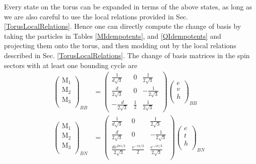 \documentclass[12pt,a4paper]{article}
\begin{document}
Every state on the torus can be expanded in terms of the above states, as long as we are also careful to use the local relations provided in Sec. \ref{TorusLocalRelations}.
Hence one can directly compute the change of basis by taking the particles in Tables \ref{MIdempotents},  and \ref{QIdempotents} and projecting them onto the torus, and then modding out by the local relations described in Sec. \ref{TorusLocalRelations}.
The change of basis matrices in the spin sectors with at least one bounding cycle are 
\begin{align}
\label{VAA}
\left( \begin{matrix}
\text{M}_1\\
\text{M}_2\\
\text{M}_3\\
\end{matrix} \right)_{BB} 
&= \left( \begin{matrix}
\frac{1}{d\sqrt{3}} & 0 & \frac{1}{2 \sqrt{3}} \\
\frac{d}{2 \sqrt{3}} & 0 & - \frac{1}{2 \sqrt{3}} \\
- \frac{d}{2 \sqrt{3}} & \frac{1}{2} & \frac{1}{2 \sqrt{3}}
\end{matrix} \right)
\left( \begin{matrix}
e\\
v\\
h\\
\end{matrix} \right)_{BB}\\
\label{VAP}  
\left( \begin{matrix}
\text{M}_1\\
\text{M}_2\\
\text{M}_3\\
\end{matrix} \right)_{BN}
&= \left( \begin{matrix}
\frac{1}{d\sqrt{3}} & 0 & \frac{1}{2 \sqrt{3}} \\
\frac{d}{2 \sqrt{3}} & 0 & - \frac{1}{2 \sqrt{3}} \\
\frac{d e^{2 \pi i/3}}{2 \sqrt{3}} & \frac{e^{- i \pi /3}}{2} & \frac{e^{- i \pi /3}}{2 \sqrt{3}}\\
\end{matrix} \right)
\left( \begin{matrix}
e\\
t\\
h\\
\end{matrix} \right)_{BN} \\
\label{VPA} 

\end{align}
\end{document}
